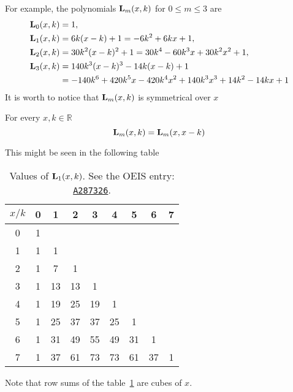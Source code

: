 For example, the polynomials ${\mathbf{L}}\sb{m}(x,k)$ for $0\leq m\leq 3$ are
\begin{equation*}
    \begin{split}
        {\mathbf{L}}\sb{0}(x,k)
        &= 1, \\
        {\mathbf{L}}\sb{1}(x,k)
        &= 6 k (x-k) + 1
        = -6 k^2 + 6 k x + 1, \\
        {\mathbf{L}}\sb{2}(x,k)
        &=30 k^2 (x-k)^2+1
        =30 k^4-60 k^3 x+30 k^2 x^2+1, \\
        {\mathbf{L}}\sb{3}(x,k)
        &= 140 k^3 (x-k)^3-14 k (x-k)+1 \\
        &=-140 k^6+420 k^5 x-420 k^4 x^2+140 k^3 x^3+14 k^2-14 k x+1
    \end{split}
\end{equation*}
It is worth to notice that ${\mathbf{L}}\sb{m}(x,k)$ is symmetrical over $x$
\begin{ppty}
    \label{ppty_symmetry_of_polynomial_l}
    For every $x,k\in\mathbb{R}$
    \begin{equation*}
        {\mathbf{L}}\sb{m}(x,k) = {\mathbf{L}}\sb{m}(x,x-k)
    \end{equation*}
\end{ppty}
This might be seen in the following table
\begin{table}[H]
    \begin{tabular}{c|cccccccc}
        $x/k$ & 0 & 1  & 2  & 3  & 4  & 5  & 6  & 7 \\ [3px]
        \hline
        0     & 1 &    &    &    &    &    &    &   \\
        1     & 1 & 1  &    &    &    &    &    &   \\
        2     & 1 & 7  & 1  &    &    &    &    &   \\
        3     & 1 & 13 & 13 & 1  &    &    &    &   \\
        4     & 1 & 19 & 25 & 19 & 1  &    &    &   \\
        5     & 1 & 25 & 37 & 37 & 25 & 1  &    &   \\
        6     & 1 & 31 & 49 & 55 & 49 & 31 & 1  &   \\
        7     & 1 & 37 & 61 & 73 & 73 & 61 & 37 & 1 \\
    \end{tabular}
    \caption{Values of ${\mathbf{L}}\sb{1}(x,k)$. See the OEIS entry: \href{https://oeis.org/A287326}{\texttt{A287326}}.}
    \label{tab:fig_1}
\end{table}
Note that row sums of the table~\ref{tab:fig_1} are cubes of $x$.
